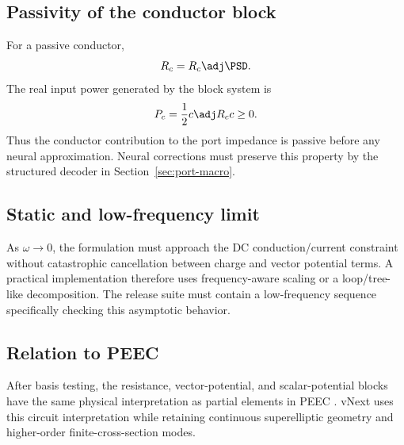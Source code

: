 \subsection{Passivity of the conductor block}

For a passive conductor,
\[
  R_c=R_c\adj\PSD.
\]
The real input power generated by the block system is
\[
  P_c
  =
  \frac12 c\adj R_c c\ge0 .
\]
Thus the conductor contribution to the port impedance is passive before any
neural approximation. Neural corrections must preserve this property by the
structured decoder in Section~\ref{sec:port-macro}.

\subsection{Static and low-frequency limit}

As $\omega\to0$, the formulation must approach the DC conduction/current
constraint without catastrophic cancellation between charge and vector
potential terms. A practical implementation therefore uses frequency-aware
scaling or a loop/tree-like decomposition. The release suite must contain a
low-frequency sequence specifically checking this asymptotic behavior.

\subsection{Relation to PEEC}

After basis testing, the resistance, vector-potential, and scalar-potential
blocks have the same physical interpretation as partial elements in PEEC
\cite{ruehli1974peec}. vNext uses this circuit interpretation while retaining
continuous superelliptic geometry and higher-order finite-cross-section modes.
